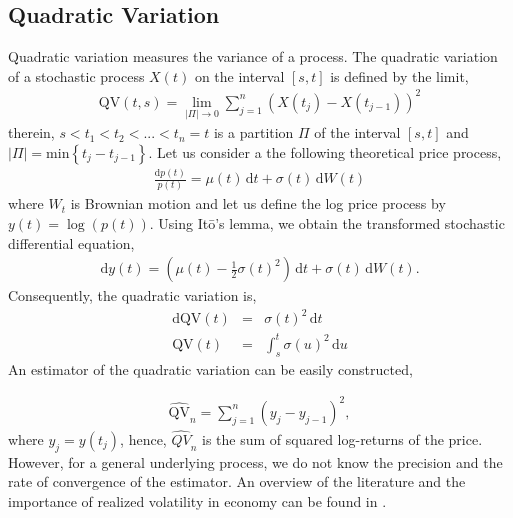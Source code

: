 \documentclass[11pt, a4paper]{thesis}  %
\newcommand{\dd}{\textrm{d}}
\begin{document}
\subsection{Quadratic Variation}
\label{section_quadratic_variation}
%
Quadratic variation measures the variance of a process. The quadratic variation of a stochastic process $X(t)$ on the interval $[s,t]$ is defined by the limit,
%
\begin{eqnarray}
	\textrm{QV}(t,s) = \lim_{|\Pi|\to 0} \sum_{j=1}^n \left(X(t_j) - X(t_{j-1})\right)^2
\end{eqnarray}
%
\noindent therein, $s < t_1 < t_2 < ... < t_n = t$  is a partition $\Pi$ of the interval $[s,t]$ and $|\Pi| = \textrm{min}\left\lbrace t_j-t_{j-1}\right\rbrace$. Let us consider a the following theoretical price process,
%
\begin{eqnarray}
	\frac{\dd p(t)}{p(t)} = \mu(t)\,\dd t + \sigma(t)\,\dd W(t)
\end{eqnarray}
%
where $W_t$ is Brownian motion and let us define the log price process by $y(t) = \log(p(t))$. Using It\={o}'s lemma, we obtain the transformed stochastic differential equation,
%
\begin{eqnarray}
	\dd y(t) = \left(\mu(t)-\frac{1}{2}\sigma(t)^2\right)\,\dd t + \sigma(t)\,\dd W(t).
\end{eqnarray}
%
Consequently, the quadratic variation is, 
%
\begin{eqnarray}
	\dd \textrm{QV}(t) 
	&=& \sigma(t)^2\,\dd t 
	\\\nonumber
	\textrm{QV}(t) &=& \int_s^t \sigma(u)^2\,\dd u
\end{eqnarray}
% 
An estimator of the quadratic variation can be easily constructed,

\begin{eqnarray}
	\hat{\textrm{QV}}_n = \sum_{j=1}^n \left(y_j-y_{j-1}\right)^2,
\end{eqnarray}
%
where $y_j = y(t_j)$, hence, $\hat{QV}_n$ is the sum of squared log-returns of the price. However, for a general underlying process, we do not know the precision and the rate of convergence of the estimator. An overview of the literature and the importance of realized volatility in economy can be found in \cite{Anderson:2000:GreatRealisations}.

%
%
\end{document}
